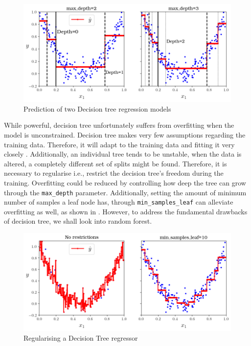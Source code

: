 \begin{figure}[h]
    \centering
    \includegraphics[width=.9\textwidth]{02_figures/fig6_5_partspace_geron09.png}
    \caption{Prediction of two Decision tree regression models \cite{Geron.2019}}
    \label{fig:geron6_5}
\end{figure}

While powerful, decision tree unfortunately suffers from overfitting when the model is unconstrained. Decision tree makes very few assumptions regarding the training data. Therefore, it will adapt to the training data and fitting it very closely \cite{Geron.2019}. Additionally, an individual tree tends to be unstable, when the data is altered, a completely different set of splits might be found\cite{Hastie.2009,Kuhn.2013}. Therefore, it is necessary to regularise i.e., restrict the decision tree's freedom during the training. Overfitting could be reduced by controlling how deep the tree can grow through the {\tt max\_depth} parameter. Additionally, setting the amount of minimum number of samples a leaf node has, through {\tt min\_samples\_leaf} can alleviate overfitting as well, as shown in . However, to address the fundamental drawbacks of decision tree, we shall look into random forest.
\begin{figure}
    \centering
        \includegraphics[width=.9\textwidth]{02_figures/fig6_6_paramdepth_geron09.png}
        \caption{Regularising a Decision Tree regressor \cite{Geron.2019}}
        \label{fig:geron6_6}
\end{figure}

